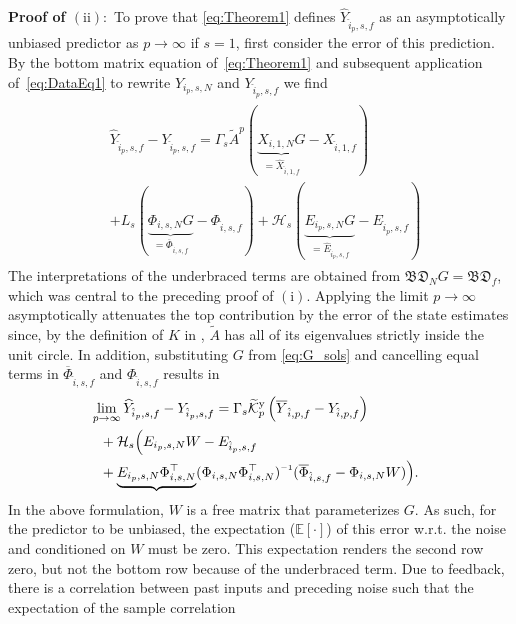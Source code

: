 \noindent\textbf{Proof of $\mathrm{(ii)}:$} To prove that \eqref{eq:Theorem1} defines $\widehat{Y}_{\hat{i}_p,s,f}$ as an asymptotically unbiased predictor as $p\rightarrow\infty$ if $s=1$, first consider the error of this prediction. By the bottom matrix equation of~\eqref{eq:Theorem1} and subsequent application of~\eqref{eq:DataEq1} to rewrite $Y_{i_p,s,N}$ and $Y_{\hat{i}_p,s,f}$ we find
\begin{align}%
    \begin{split}
        &\!\!\!\widehat{Y}_{\hat{i}_p,s,f}-Y_{\hat{i}_p,s,f} = \Gamma_s \tilde{A}^p (\underbrace{X_{i,1,N}G}_{=\widehat{X}_{\hat{i},1,f}}-X_{\hat{i},1,f}) \\
        &+L_s(\underbrace{\Phi_{i,s,N}G}_{=\overline{\Phi}_{\hat{i},s,f}}-\Phi_{\hat{i},s,f}) +\mathcal{H}_s (\underbrace{E_{i_p,s,N}G}_{=\widehat{E}_{\hat{i}_p,s,f}}-E_{\hat{i}_p,s,f})
    \end{split}
\end{align}
The interpretations of the underbraced terms are obtained from $\mathfrak{BD}_N G=\mathfrak{BD}_f$, which was central to the preceding proof of $\mathrm{(i)}$. Applying the limit $p\rightarrow\infty$ asymptotically attenuates the top contribution by the error of the state estimates since, by the definition of $K$ in , $\tilde{A}$ has all of its eigenvalues strictly inside the unit circle. In addition, substituting $G$ from \eqref{eq:G_sols} and cancelling equal terms in $\overline{\Phi}_{\hat{i},s,f}$ and $\Phi_{\hat{i},s,f}$ results in
\begin{alignat}{2}
        &\!\!\!\!\lim_{p\rightarrow\infty} \widehat{Y}_{\hat{i}_p,s,f}-Y_{\hat{i}_p,s,f} = \Gamma_s\tKp{y}\left(\overline{Y}_{\hat{i},p,f}-Y_{\hat{i},p,f}\right)\notag\\
        &+\mathcal{H}_s\Big(E_{i_p,s,N} W-E_{\hat{i}_p,s,f}\\%
        &+\underbrace{E_{i_p,s,N}\Phi_{i,s,N}^\top}(\Phi_{i,s,N}\Phi_{i,s,N}^\top)\inv(\overline{\Phi}_{\hat{i},s,f}-\Phi_{i,s,N}W)\Big)\notag.
\end{alignat}%
In the above formulation, $W$ is a free matrix that parameterizes $G$. As such, for the predictor to be unbiased, the expectation ($\mathbb{E}[\cdot]$) of this error w.r.t. the noise and conditioned on $W$ must be zero.  This expectation renders the second row zero, but not the bottom row because of the underbraced term. Due to feedback, there is a correlation between past inputs and preceding noise such that the expectation of the sample correlation
